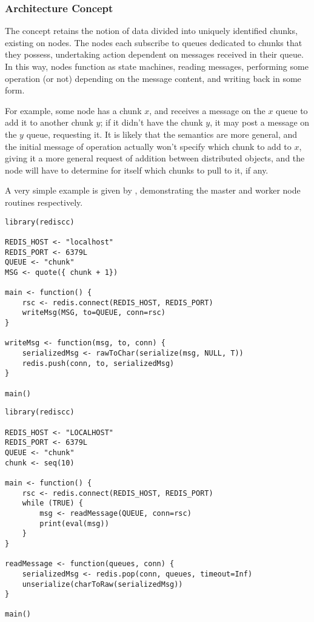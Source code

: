 \hypertarget{architecture-concept}{%
\subsubsection{Architecture Concept}\label{architecture-concept}}

The concept retains the notion of data divided into uniquely identified
chunks, existing on nodes. The nodes each subscribe to queues dedicated
to chunks that they possess, undertaking action dependent on messages
received in their queue. In this way, nodes function as state machines,
reading messages, performing some operation (or not) depending on the
message content, and writing back in some form.

For example, some node has a chunk \(x\), and receives a message on the
\(x\) queue to add it to another chunk \(y\); if it didn't have the
chunk \(y\), it may post a message on the \(y\) queue, requesting it. It
is likely that the semantics are more general, and the initial message
of operation actually won't specify which chunk to add to \(x\), giving
it a more general request of addition between distributed objects, and
the node will have to determine for itself which chunks to pull to it,
if any.

A very simple example is given by \cite{lst:msg-q-master}
\cite{lst:msg-q-worker}, demonstrating the master and worker node routines
respectively.

\hypertarget{lst:msg-q-master}{%
\label{lst:msg-q-master}}%
\begin{verbatim}
library(rediscc)

REDIS_HOST <- "localhost"
REDIS_PORT <- 6379L
QUEUE <- "chunk"
MSG <- quote({ chunk + 1})

main <- function() {
    rsc <- redis.connect(REDIS_HOST, REDIS_PORT)
    writeMsg(MSG, to=QUEUE, conn=rsc)
}

writeMsg <- function(msg, to, conn) {
    serializedMsg <- rawToChar(serialize(msg, NULL, T))
    redis.push(conn, to, serializedMsg)
}

main()
\end{verbatim}

\hypertarget{lst:msg-q-worker}{%
\label{lst:msg-q-worker}}%
\begin{verbatim}
library(rediscc)

REDIS_HOST <- "LOCALHOST"
REDIS_PORT <- 6379L
QUEUE <- "chunk"
chunk <- seq(10)

main <- function() {
    rsc <- redis.connect(REDIS_HOST, REDIS_PORT)
    while (TRUE) {
        msg <- readMessage(QUEUE, conn=rsc)
        print(eval(msg))
    }
}

readMessage <- function(queues, conn) {
    serializedMsg <- redis.pop(conn, queues, timeout=Inf)
    unserialize(charToRaw(serializedMsg))
}

main()
\end{verbatim}

